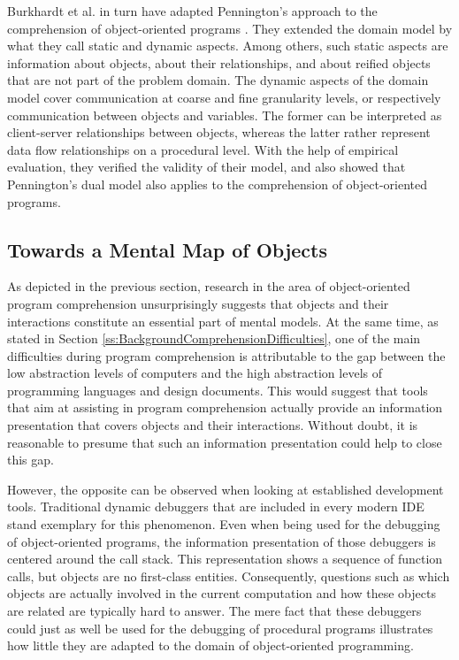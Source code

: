 Burkhardt et al. in turn have adapted Pennington's approach to the comprehension of object-oriented programs \cite{burkhardt_mental_1997}.
They extended the domain model by what they call static and dynamic aspects.
Among others, such static aspects are information about objects, about their relationships, and about reified objects that are not part of the problem domain.
The dynamic aspects of the domain model cover communication at coarse and fine  granularity levels, or respectively communication between objects and variables.
The former can be interpreted as client-server relationships between objects, whereas the latter rather represent data flow relationships on a procedural level.
With the help of empirical evaluation, they verified the validity of their model, and also showed that Pennington's dual model also applies to the comprehension of object-oriented programs.

\subsection{Towards a Mental Map of Objects}
\label{ss:BackgroundComprehensionMentalMap}
As depicted in the previous section, research in the area of object-oriented program comprehension unsurprisingly suggests that objects and their interactions constitute an essential part of mental models.
At the same time, as stated in Section \ref{ss:BackgroundComprehensionDifficulties}, one of the main difficulties during program comprehension is attributable to the gap between the low abstraction levels of computers and the high abstraction levels of programming languages and design documents.
This would suggest that tools that aim at assisting in program comprehension actually provide an information presentation that covers objects and their interactions.
Without doubt, it is reasonable to presume that such an information presentation could help to close this gap.

However, the opposite can be observed when looking at established development tools.
Traditional dynamic debuggers that are included in every modern IDE stand exemplary for this phenomenon.
Even when being used for the debugging of object-oriented programs, the information presentation of those debuggers is centered around the call stack.
This representation shows a sequence of function calls, but objects are no first-class entities.
Consequently, questions such as which objects are actually involved in the current computation and how these objects are related are typically hard to answer.
The mere fact that these debuggers could just as well be used for the debugging of procedural programs illustrates how little they are adapted to the domain of object-oriented programming.

